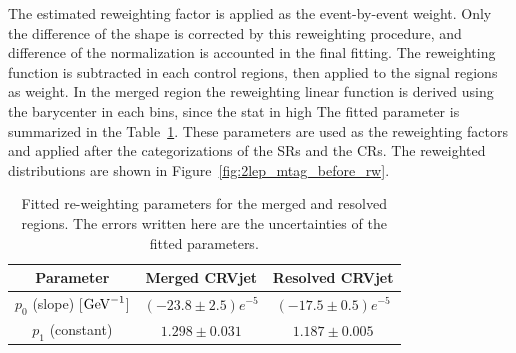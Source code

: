 The estimated reweighting factor is applied as the event-by-event weight. 
Only the difference of the shape is corrected by this reweighting procedure, and difference of the normalization is accounted in the final fitting.
The reweighting function is subtracted in each control regions, then applied to the signal regions as weight.
In the merged region the reweighting linear function is derived using the barycenter in each bins, since the stat in high 
The fitted parameter is summarized in the Table~\ref{tab:fit}. These parameters are used as the reweighting factors and applied after the categorizations of the SRs and the CRs. The reweighted distributions are shown in Figure~\ref{fig:2lep_mtag_before_rw}.

\begin{table}[htbp]
 \footnotesize
\begin{center}
\begin{tabular}{ | c | c | c |}
\hline
Parameter & Merged CRVjet & Resolved CRVjet  \\
\hline
$p_{0}$ (slope) [$\mathrm{GeV}^{-1}$] & $(-23.8 \pm 2.5)e^{-5}$ &  $(-17.5 \pm 0.5)e^{-5}$ \\
 \hline
$p_{1}$ (constant)  & $1.298 \pm 0.031$ & $1.187 \pm 0.005$ \\
\hline
\end{tabular}
\caption{\label{tab:fit} Fitted re-weighting parameters for the merged and resolved regions. The errors written here are the uncertainties of the fitted parameters. }
  \end{center}
\end{table}


